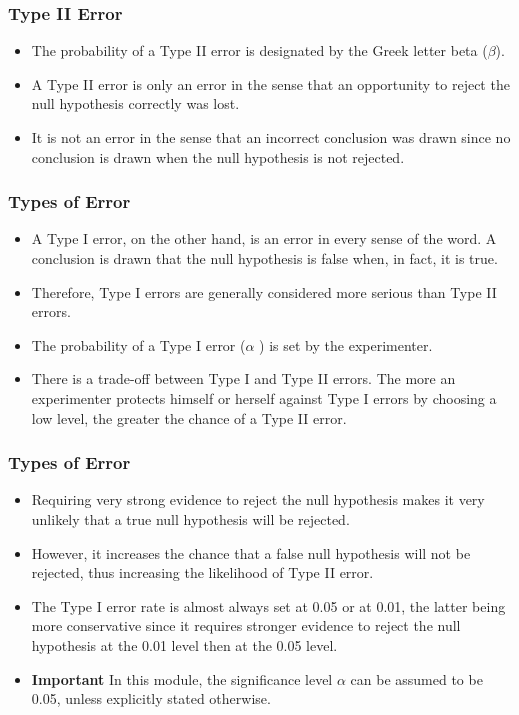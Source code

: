 \documentclass[a4]{beamer}
\begin{document}
\begin{frame}
\frametitle{Type II Error}
\begin{itemize}

\item The probability of a Type II error is designated by the Greek letter beta ($\beta$).
\item A Type II error is only an error in the sense that an opportunity to reject the null hypothesis correctly was lost.
\item It is not an error in the sense that an incorrect conclusion was drawn since no conclusion is drawn when the null hypothesis is not rejected.
\end{itemize}
\end{frame}
\begin{frame}
\frametitle{Types of Error}
\large
\begin{itemize}
\item
A Type I error, on the other hand, is an error in every sense of the word. A conclusion is drawn that the null hypothesis is false when, in fact, it is true. \item Therefore, Type I errors are generally considered more serious than Type II errors.
\item
The probability of a Type I error ($\alpha$ ) is set by the experimenter. \item There is a trade-off between Type I and Type II errors. The more an experimenter protects himself or herself against Type I errors by choosing a low level, the greater the chance of a Type II error.
\end{itemize}
\end{frame}
\begin{frame}
\frametitle{Types of Error}
\large
\begin{itemize}
\item
Requiring very strong evidence to reject the null hypothesis makes it very unlikely that a true null hypothesis will be rejected. \item However, it increases the chance that a false null hypothesis will not be rejected, thus increasing the likelihood of Type II error.
\item
The Type I error rate is almost always set at 0.05 or at 0.01, the latter being more conservative since it requires stronger evidence to reject the null hypothesis at the 0.01 level then at the 0.05 level.
\item \textbf{Important} In this module, the significance level $\alpha$ can be assumed to be 0.05, unless explicitly stated otherwise.
\end{itemize}
\end{frame}
\end{document}
